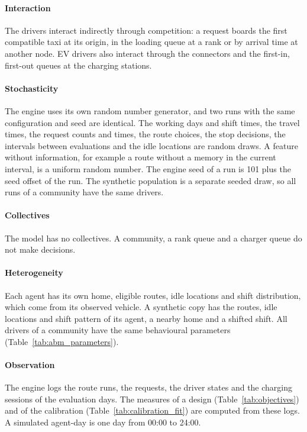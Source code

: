 \paragraph{Interaction} The drivers interact indirectly through competition: a request boards the first compatible taxi at its origin, in the loading queue at a rank or by arrival time at another node. EV drivers also interact through the connectors and the first-in, first-out queues at the charging stations.

\paragraph{Stochasticity} The engine uses its own random number generator, and two runs with the same configuration and seed are identical. The working days and shift times, the travel times, the request counts and times, the route choices, the stop decisions, the intervals between evaluations and the idle locations are random draws. A feature without information, for example a route without a memory in the current interval, is a uniform random number. The engine seed of a run is 101 plus the seed offset of the run. The synthetic population is a separate seeded draw, so all runs of a community have the same drivers.

\paragraph{Collectives} The model has no collectives. A community, a rank queue and a charger queue do not make decisions.

\paragraph{Heterogeneity} Each agent has its own home, eligible routes, idle locations and shift distribution, which come from its observed vehicle. A synthetic copy has the routes, idle locations and shift pattern of its agent, a nearby home and a shifted shift. All drivers of a community have the same behavioural parameters (Table~\ref{tab:abm_parameters}).

\paragraph{Observation} The engine logs the route runs, the requests, the driver states and the charging sessions of the evaluation days. The measures of a design (Table~\ref{tab:objectives}) and of the calibration (Table~\ref{tab:calibration_fit}) are computed from these logs. A simulated agent-day is one day from 00:00 to 24:00.

